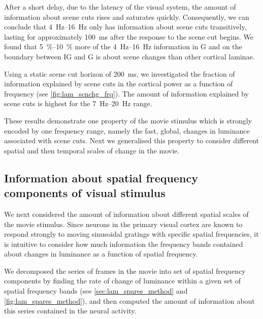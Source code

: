 After a short delay, due to the latency of the visual system, the amount of information about scene cuts rises and saturates quickly.
Consequently, we can conclude that \SIrange{4}{16}{Hz} only has information about scene cuts transitively, lasting for approximately \SI{100}{\milli\second} after the response to the scene cut begins.
We found that \SIrange{5}{10}{\percent} more of the \SIrange{4}{16}{Hz} information in \ac{G} and on the boundary between \ac{IG} and \ac{G} is about scene changes than other cortical laminae.

Using a static scene cut horizon of \SI{200}{\milli\second}, we investigated the fraction of information explained by scene cuts in the cortical power as a function of frequency (see \autoref{fig:lam_scnchg_frq}).
The amount of information explained by scene cuts is highest for the \SIrange{7}{20}{Hz} range.

These results demonstrate one property of the movie stimulus which is strongly encoded by one frequency range, namely the fast, global, changes in luminance associated with scene cuts.
Next we generalised this property to consider different spatial and then temporal scales of change in the movie.


\subsection{Information about spatial frequency components of visual stimulus}

We next considered the amount of information about different spatial scales of the movie stimulus.
Since neurons in the primary visual cortex are known to respond strongly to moving sinusoidal gratings with specific spatial frequencies, it is intuitive to consider how much information the frequency bands contained about changes in luminance as a function of spatial frequency.

We decomposed the series of frames in the movie into set of spatial frequency components by finding the rate of change of luminance within a given set of spatial frequency bands (see \autoref{sec:lam_spares_method} and \autoref{fig:lam_spares_method}), and then computed the amount of information about this series contained in the neural activity.

